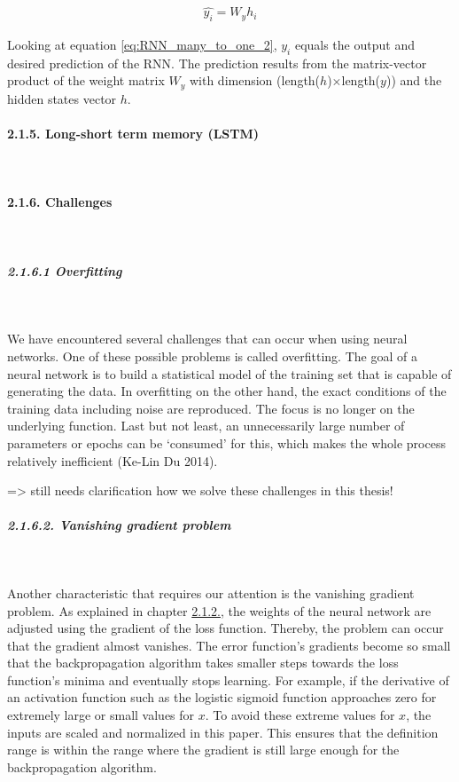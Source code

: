 \documentclass[
]{article}
\begin{document}
\begin{align} \label{eq:RNN_many_to_one_2}
  \hat{y_{i}} = W_{y}h_{i}
\end{align}

Looking at equation \ref{eq:RNN_many_to_one_2}, \(y_{i}\) equals the
output and desired prediction of the RNN. The prediction results from
the matrix-vector product of the weight matrix \(W_{y}\) with dimension
(length(\(h\))\(\times\)length(\(y\))) and the hidden states vector
\(h\).

\hypertarget{LSTM}{%
\paragraph{2.1.5. Long-short term memory (LSTM)}\label{LSTM}}

~

\hypertarget{challenges}{%
\paragraph{2.1.6. Challenges}\label{challenges}}

~

\hypertarget{overfitting}{%
\subparagraph{2.1.6.1 Overfitting}\label{overfitting}}

~

We have encountered several challenges that can occur when using neural
networks. One of these possible problems is called overfitting. The goal
of a neural network is to build a statistical model of the training set
that is capable of generating the data. In overfitting on the other
hand, the exact conditions of the training data including noise are
reproduced. The focus is no longer on the underlying function. Last but
not least, an unnecessarily large number of parameters or epochs can be
`consumed' for this, which makes the whole process relatively
inefficient (Ke-Lin Du 2014).

=\textgreater{} still needs clarification how we solve these challenges
in this thesis!

\hypertarget{vanishing_gradient}{%
\subparagraph{2.1.6.2. Vanishing gradient
problem}\label{vanishing_gradient}}

~

Another characteristic that requires our attention is the vanishing
gradient problem. As explained in chapter
\protect\hyperlink{backpropagation_algorithm}{2.1.2.}, the weights of
the neural network are adjusted using the gradient of the loss function.
Thereby, the problem can occur that the gradient almost vanishes. The
error function's gradients become so small that the backpropagation
algorithm takes smaller steps towards the loss function's minima and
eventually stops learning. For example, if the derivative of an
activation function such as the logistic sigmoid function approaches
zero for extremely large or small values for \(x\). To avoid these
extreme values for \(x\), the inputs are scaled and normalized in this
paper. This ensures that the definition range is within the range where
the gradient is still large enough for the backpropagation algorithm.
\end{document}
